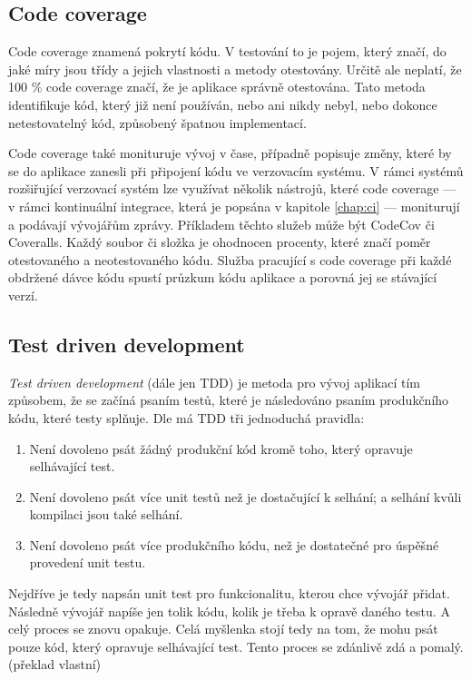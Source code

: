 \subsection{Code coverage}

Code coverage znamená pokrytí kódu.
V testování to je pojem,
který značí,
do jaké míry jsou třídy a jejich vlastnosti a metody otestovány.
Určitě ale neplatí,
že 100 \% code coverage značí,
že je aplikace správně otestována.
Tato metoda identifikuje kód,
který již není používán,
nebo ani nikdy nebyl,
nebo dokonce netestovatelný kód,
způsobený špatnou implementací.
\cite{code_coverage}

Code coverage také monituruje vývoj v čase,
případně popisuje změny,
které by se do aplikace zanesli při připojení kódu ve verzovacím systému.
V rámci systémů rozšiřující verzovací systém lze využívat několik nástrojů,
které code coverage
--- v rámci kontinuální integrace, která je popsána v kapitole \ref{chap:ci} ---
moniturují a podávají vývojářům zprávy.
Příkladem těchto služeb může být CodeCov či Coveralls.
Každý soubor či složka je ohodnocen procenty,
které značí poměr otestovaného a neotestovaného kódu.
Služba pracující s code coverage při každé obdržené dávce kódu spustí
průzkum kódu aplikace a porovná jej se stávající verzí.
\cite{code_coverage}

\subsection{Test driven development}

\emph{Test driven development} (dále jen TDD) je metoda pro vývoj aplikací tím
způsobem,
že se začíná psaním testů,
které je následováno psaním produkčního kódu,
které testy splňuje.
Dle \cite{tdd} má TDD tři jednoduchá pravidla:

\begin{enumerate}
    \item Není dovoleno psát žádný produkční kód kromě toho,
    který opravuje selhávající test.
    \item Není dovoleno psát více unit testů než je dostačující k selhání;
    a selhání kvůli kompilaci jsou také selhání.
    \item Není dovoleno psát více produkčního kódu,
    než je dostatečné pro úspěšné provedení unit testu.
\end{enumerate}

Nejdříve je tedy napsán unit test pro funkcionalitu,
kterou chce vývojář přidat.
Následně vývojář napíše jen tolik kódu,
kolik je třeba k opravě daného testu.
A celý proces se znovu opakuje.
Celá myšlenka \cite{tdd} stojí tedy na tom,
že mohu psát pouze kód,
který opravuje selhávající test.
Tento proces se zdánlivě zdá  a pomalý.
\emph{} \cite{tdd} (překlad vlastní)

